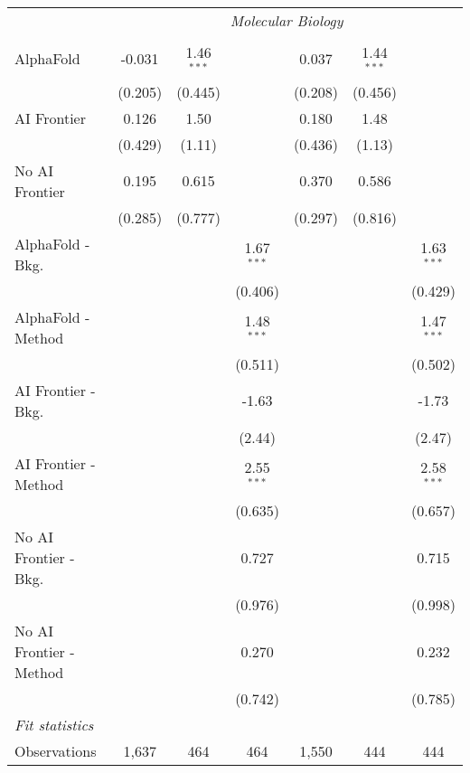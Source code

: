\begin{tabular}{lcccccc}
 & \multicolumn{6}{c}{\textit{Molecular Biology}} \\ \\
   AlphaFold               & -0.031  & 1.46$^{***}$ &              & 0.037   & 1.44$^{***}$ &   \\   
                           & (0.205) & (0.445)      &              & (0.208) & (0.456)      &   \\   
   AI Frontier             & 0.126   & 1.50         &              & 0.180   & 1.48         &   \\   
                           & (0.429) & (1.11)       &              & (0.436) & (1.13)       &   \\   
   No AI Frontier          & 0.195   & 0.615        &              & 0.370   & 0.586        &   \\   
                           & (0.285) & (0.777)      &              & (0.297) & (0.816)      &   \\   
   AlphaFold - Bkg.        &         &              & 1.67$^{***}$ &         &              & 1.63$^{***}$\\   
                           &         &              & (0.406)      &         &              & (0.429)\\   
   AlphaFold - Method      &         &              & 1.48$^{***}$ &         &              & 1.47$^{***}$\\   
                           &         &              & (0.511)      &         &              & (0.502)\\   
   AI Frontier - Bkg.      &         &              & -1.63        &         &              & -1.73\\   
                           &         &              & (2.44)       &         &              & (2.47)\\   
   AI Frontier - Method    &         &              & 2.55$^{***}$ &         &              & 2.58$^{***}$\\   
                           &         &              & (0.635)      &         &              & (0.657)\\   
   No AI Frontier - Bkg.   &         &              & 0.727        &         &              & 0.715\\   
                           &         &              & (0.976)      &         &              & (0.998)\\   
   No AI Frontier - Method &         &              & 0.270        &         &              & 0.232\\   
                           &         &              & (0.742)      &         &              & (0.785)\\   
   \midrule
   \emph{Fit statistics}\\
   Observations            & 1,637   & 464          & 464          & 1,550   & 444          & 444\\  
   

\end{tabular}
